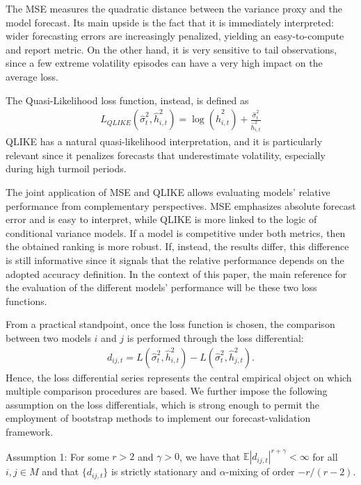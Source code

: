 \documentclass{article} %
\begin{document}
	The MSE measures the quadratic distance between the variance proxy and the model forecast. Its main upside is the fact that it is immediately interpreted: wider forecasting errors are increasingly penalized, yielding an easy-to-compute and report metric. On the other hand, it is very sensitive to tail observations, since a few extreme volatility episodes can have a very high impact on the average loss.
	
	The Quasi-Likelihood loss function, instead, is defined as
	\begin{align}
	L_{QLIKE}(\hat{\sigma}_t^2,\hat{h}_{i,t}^2)
	=
	\log(\hat{h}_{i,t}^2)
	+
	\frac{\hat{\sigma}_t^2}{\hat{h}_{i,t}^2}
	\end{align}
	QLIKE has a natural quasi-likelihood interpretation, and it is particularly relevant since it penalizes forecasts that underestimate volatility, especially during high turmoil periods.
	
	The joint application of MSE and QLIKE allows evaluating models' relative performance from complementary perspectives. MSE emphasizes absolute forecast error and is easy to interpret, while QLIKE is more linked to the logic of conditional variance models. If a model is competitive under both metrics, then the obtained ranking is more robust. If, instead, the results differ, this difference is still informative since it signals that the relative performance depends on the adopted accuracy definition. In the context of this paper, the main reference for the evaluation of the different models' performance will be these two loss functions.
	
	\newpage
	
	From a practical standpoint, once the loss function is chosen, the comparison between two models $i$ and $j$ is performed through the loss differential: 
	\begin{align}
	d_{ij,t}
	=
	L(\hat{\sigma}_t^2,\hat{h}_{i,t}^2)
	-
	L(\hat{\sigma}_t^2,\hat{h}_{j,t}^2).
	\end{align}
	Hence, the loss differential series represents the central empirical object on which multiple comparison procedures are based. We further impose the following assumption on the loss differentials, which is strong enough to permit the employment of bootstrap methods to implement our forecast-validation framework.
	
	Assumption 1: For some $r>2$ and $\gamma > 0$, we have that $\mathbb{E}|d_{ij,t}|^{r + \gamma} < \infty$ for all $i,j \in M$ and that $\{d_{ij,t}\}$ is strictly stationary and $\alpha$-mixing of order $-r/(r-2)$.
	
\end{document}
